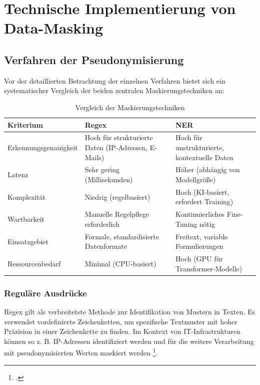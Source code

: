 \chapter{Technische Implementierung von Data-Masking}

\section{Verfahren der Pseudonymisierung}

Vor der detaillierten Betrachtung der einzelnen Verfahren bietet sich ein systematischer Vergleich der beiden zentralen Maskierungstechniken an:

\begin{table}[ht]
    \centering
    \footnotesize
    \caption{Vergleich der Maskierungstechniken}
    \label{tab:maskierungstechniken}
    \begin{tabular}{@{} >{\raggedright\arraybackslash}p{3.5cm} >{\raggedright\arraybackslash}p{5.5cm} >{\raggedright\arraybackslash}p{5.5cm} @{}}
        \toprule
        \textbf{Kriterium}    & \textbf{\ac{Regex}}                                 & \textbf{\ac{NER}}                            \\
        \midrule
        Erkennungsgenauigkeit & Hoch für strukturierte Daten (IP-Adressen, E-Mails) & Hoch für unstrukturierte, kontextuelle Daten \\
        Latenz                & Sehr gering (Millisekunden)                         & Höher (abhängig von Modellgröße)             \\
        Komplexität           & Niedrig (regelbasiert)                              & Hoch (KI-basiert, erfordert Training)        \\
        Wartbarkeit           & Manuelle Regelpflege erforderlich                   & Kontinuierliches Fine-Tuning nötig           \\
        Einsatzgebiet         & Formale, standardisierte Datenformate               & Freitext, variable Formulierungen            \\
        Ressourcenbedarf      & Minimal (CPU-basiert)                               & Hoch (GPU für Transformer-Modelle)           \\
        \bottomrule
    \end{tabular}
\end{table}

\subsection{Reguläre Ausdrücke}
\ac{Regex} gilt als verbreitetste Methode zur Identifikation von Mustern in Texten.
Es verwendet vordefinierte Zeichenketten, um spezifische Textmuster mit hoher Präzision in einer Zeichenkette zu finden.
Im Kontext von IT-Infrastrukturen können so z. B. IP-Adressen identifiziert werden und für die weitere Verarbeitung
mit pseudonymisierten Werten maskiert werden \footcite{tobiloba2025enhancingocr}.

